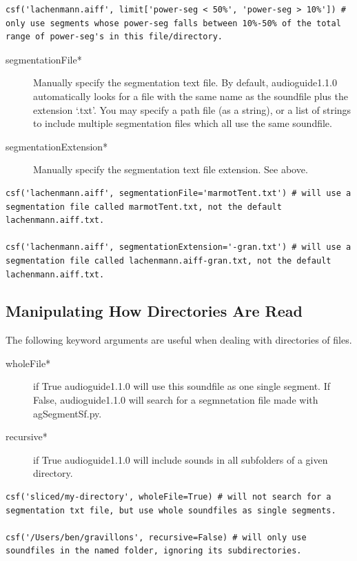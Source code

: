 \documentclass{article}
\newcommand{\ag}{audioguide1.1.0\xspace}
\begin{document}
\begin{spacing}{1.2}
\begin{lstlisting}
csf('lachenmann.aiff', limit['power-seg < 50%', 'power-seg > 10%']) # only use segments whose power-seg falls between 10%-50% of the total range of power-seg's in this file/directory.
\end{lstlisting}
\begin{description}
\item[segmentationFile*] Manually specify the segmentation text file. By default, \ag automatically looks for a file with the same name as the soundfile plus the extension `.txt'. You may specify a path file (as a string), or a list of strings to include multiple segmentation files which all use the same soundfile.

\item[segmentationExtension*] Manually specify the segmentation text file extension.  See above.
\end{description}

\begin{lstlisting}
csf('lachenmann.aiff', segmentationFile='marmotTent.txt') # will use a segmentation file called marmotTent.txt, not the default lachenmann.aiff.txt.

csf('lachenmann.aiff', segmentationExtension='-gran.txt') # will use a segmentation file called lachenmann.aiff-gran.txt, not the default lachenmann.aiff.txt.
\end{lstlisting}




\subsection{Manipulating How Directories Are Read}
The following keyword arguments are useful when dealing with directories of files.
\begin{description}
\item[wholeFile*] if True \ag will use this soundfile as one single segment.  If False, \ag will search for a segmnetation file made with agSegmentSf.py.

\item[recursive*] if True \ag will include sounds in all subfolders of a given directory.
\end{description}

\begin{lstlisting}
csf('sliced/my-directory', wholeFile=True) # will not search for a segmentation txt file, but use whole soundfiles as single segments.

csf('/Users/ben/gravillons', recursive=False) # will only use soundfiles in the named folder, ignoring its subdirectories.
\end{lstlisting}


\end{spacing}
\end{document}
